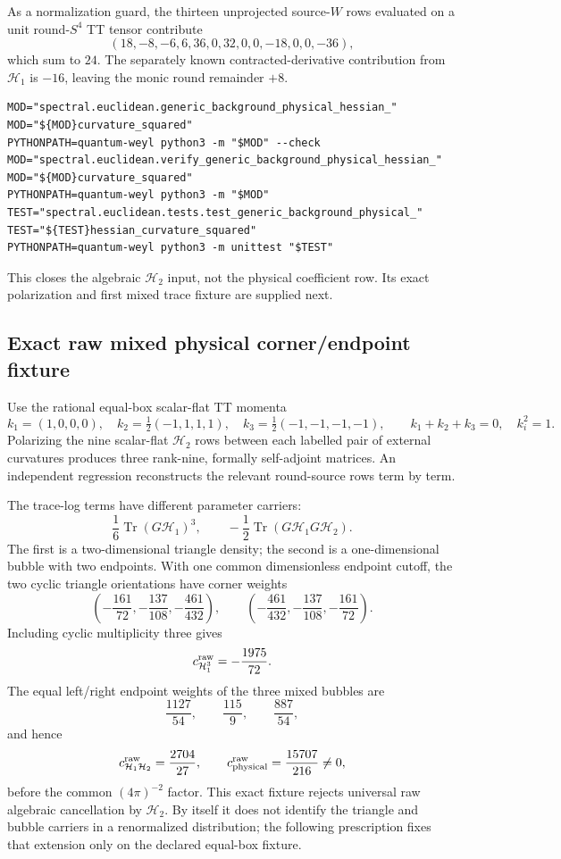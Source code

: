 \documentclass[11pt]{article}
\theoremstyle{definition}
\theoremstyle{remark}
\begin{document}
As a normalization guard, the thirteen unprojected source-$W$ rows evaluated
on a unit round-$S^4$ TT tensor contribute
\[
 (18,-8,-6,6,36,0,32,0,0,-18,0,0,-36),
\]
which sum to $24$.  The separately known contracted-derivative contribution
from $\mathcal H_1$ is $-16$, leaving the monic round remainder $+8$.

\begin{verbatim}
MOD="spectral.euclidean.generic_background_physical_hessian_"
MOD="${MOD}curvature_squared"
PYTHONPATH=quantum-weyl python3 -m "$MOD" --check
MOD="spectral.euclidean.verify_generic_background_physical_hessian_"
MOD="${MOD}curvature_squared"
PYTHONPATH=quantum-weyl python3 -m "$MOD"
TEST="spectral.euclidean.tests.test_generic_background_physical_"
TEST="${TEST}hessian_curvature_squared"
PYTHONPATH=quantum-weyl python3 -m unittest "$TEST"
\end{verbatim}

This closes the algebraic $\mathcal H_2$ input, not the physical coefficient
row.  Its exact polarization and first mixed trace fixture are supplied next.

\subsection{Exact raw mixed physical corner/endpoint fixture}

Use the rational equal-box scalar-flat TT momenta
\[
 k_1=(1,0,0,0),\quad
 k_2=\tfrac12(-1,1,1,1),\quad
 k_3=\tfrac12(-1,-1,-1,-1),
 \qquad k_1+k_2+k_3=0,\quad k_i^2=1.
\]
Polarizing the nine scalar-flat $\mathcal H_2$ rows between each labelled
pair of external curvatures produces three rank-nine, formally self-adjoint
matrices.  An independent regression reconstructs the relevant round-source
rows term by term.

The trace-log terms have different parameter carriers:
\[
 \frac16\operatorname{Tr}(G\mathcal H_1)^3,
 \qquad
 -\frac12\operatorname{Tr}(G\mathcal H_1G\mathcal H_2).
\]
The first is a two-dimensional triangle density; the second is a
one-dimensional bubble with two endpoints.  With one common dimensionless
endpoint cutoff, the two cyclic triangle orientations have corner weights
\[
 \left(-\frac{161}{72},-\frac{137}{108},-\frac{461}{432}\right),
 \qquad
 \left(-\frac{461}{432},-\frac{137}{108},-\frac{161}{72}\right).
\]
Including cyclic multiplicity three gives
\[
 c^{\rm raw}_{\mathcal H_1^3}=-\frac{1975}{72}.
\]
The equal left/right endpoint weights of the three mixed bubbles are
\[
 \frac{1127}{54},\qquad \frac{115}{9},\qquad \frac{887}{54},
\]
and hence
\[
 c^{\rm raw}_{\mathcal H_1\mathcal H_2}=\frac{2704}{27},
 \qquad
 c^{\rm raw}_{\rm physical}=\frac{15707}{216}\ne0,
\]
before the common $(4\pi)^{-2}$ factor.  This exact fixture rejects universal
raw algebraic cancellation by $\mathcal H_2$.  By itself it does not identify
the triangle and bubble carriers in a renormalized distribution; the following
prescription fixes that extension only on the declared equal-box fixture.
\end{document}
